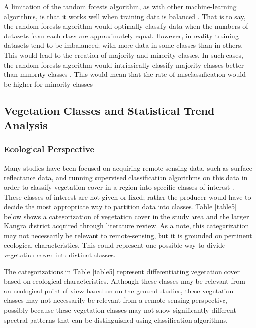 \justify
A limitation of the random forests algorithm, as with other machine-learning algorithms, is that it works well when training data is balanced \citep{Machado2015, phung2009}. That is to say, the random forests algorithm would optimally classify data when the numbers of datasets from each class are approximately equal. However, in reality training datasets tend to be imbalanced; with more data in some classes than in others. This would lead to the creation of majority and minority classes. In such cases, the random forests algorithm would intrinsically classify majority classes better than minority classes  \citep{phung2009}. This would mean that the rate of misclassification would be higher for minority classes  \citep{phung2009}.

\subsection{Vegetation Classes and Statistical Trend Analysis}

\subsubsection{Ecological Perspective}

\justify
Many studies have been focused on acquiring remote-sensing data, such as surface reflectance data, and running supervised classification algorithms on this data in order to classify vegetation cover in a region into specific classes of interest \citep{joshi2001, puletti2016, HPRS2009}. These classes of interest are not given or fixed; rather the producer would have to decide the most appropriate way to partition data into classes. Table \ref{table5} below shows a categorization of vegetation cover in the study area and the larger Kangra district acquired through literature review. As a note, this categorization may not necessarily be relevant to remote-sensing, but it is grounded on pertinent ecological characteristics. This could represent one possible way to divide vegetation cover into distinct classes.

\justify
The categorizations in Table \ref{table5} represent differentiating vegetation cover based on ecological characteristics. Although these classes may be relevant from an ecological point-of-view based on on-the-ground studies, these vegetation classes may not necessarily be relevant from a remote-sensing perspective, possibly because these vegetation classes may not show significantly different spectral patterns that can be distinguished using classification algorithms. 

